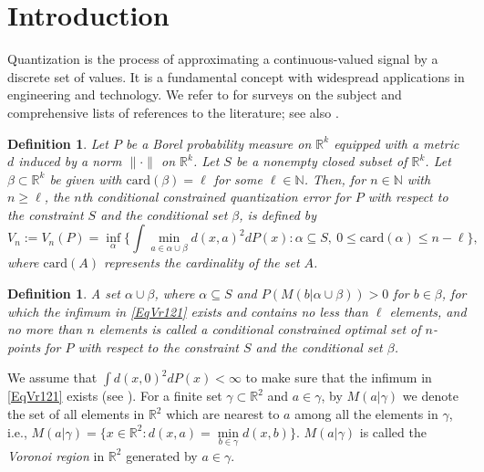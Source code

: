 \documentclass[12pt, reqno]{amsart}
\theoremstyle{plain}
\newtheorem{defi}[subsection]{Definition}
\theoremstyle{definition}
\newcommand{\uu}{\cup}%
\newcommand{\ci}{\subseteq}%
\newcommand{\sci}{\subset}%
\newcommand{\set}[1]{\{#1\}}%
\newcommand{\ga}{\alpha}
\newcommand{\gb}{\beta}
\renewcommand{\gg}{\gamma}%
\newcommand{\tit}{\textit}%
\newcommand{\D}[1]{\mathbb{#1}}%
\newcommand{\te}{\text}%
\begin{document}
\section{Introduction}


Quantization is the process of approximating a continuous-valued signal by a discrete set of values. It is a fundamental concept with widespread applications in engineering and technology. We refer to \cite{GG, GN, Z2} for surveys on the subject and comprehensive lists of references to the literature; see also \cite{AW, GKL, GL1, Z1}. 


 \begin{defi}\label{EqVr1110}
Let $P$ be a Borel probability measure on $\D R^k$ equipped with a metric $d$ induced by a norm $\|\cdot\|$ on $\D R^k$. 
Let $S$ be a nonempty closed subset of $\D R^k$. Let $\gb\sci \D R^k$ be given with $\te{card}(\gb)=\ell$ for some $\ell\in \D N$. 
Then, for $n\in \D N$ with $n\geq \ell$, the \tit {$n$th conditional constrained quantization
error} for $P$ with respect to the constraint $S$ and the conditional set $\gb$, is defined by
\begin{equation}\label{EqVr121} 
V_{n}:=V_{n}(P)=\inf_{\ga} \Big\{\int \mathop{\min}\limits_{a\in\ga\uu\gb} d(x, a)^2 dP(x) : \ga \ci S, ~ 0\leq  \text{card}(\ga) \leq n-\ell \Big\},
\end{equation} 
where $\te{card}(A)$ represents the cardinality of the set $A$. 
\end{defi} 
 
\begin{defi}
A set $ \ga\uu\gb$, where $\ga \ci S$ and $P(M(b|\ga\uu \gb))>0$ for $b\in \gb$, for which the infimum in  \eqref{EqVr121} exists and contains no less than $\ell$ elements, and no more than $n$ elements is called a \tit{conditional constrained optimal set of $n$-points} for $P$ with respect to the constraint $S$ and the conditional set $\gb$.  
\end{defi}

We assume that $\int d(x, 0)^2 dP(x)<\infty$ to make sure that the infimum in \eqref{EqVr121} exists (see \cite{PR1}).  For a finite set $\gg \sci \D R^2$ and $a\in \gg$, by $M(a|\gg)$ we denote the set of all elements in $\D R^2$ which are nearest to $a$ among all the elements in $\gg$, i.e.,
$M(a|\gg)=\set{x \in \D R^2 : d(x, a)=\mathop{\min}\limits_{b \in \gg}d(x, b)}.$
$M(a|\gg)$ is called the \tit{Voronoi region} in $\D R^2$ generated by $a\in \gg$. 
\end{document}
